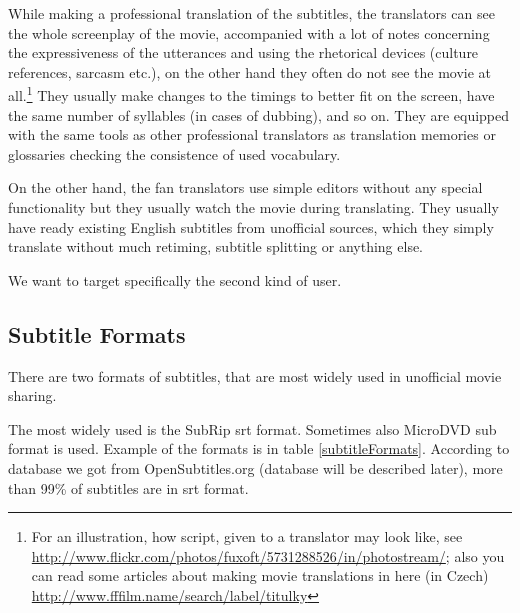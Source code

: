 While making a professional translation of the subtitles, the translators can see the whole screenplay of the movie, accompanied with a lot of notes concerning the expressiveness of the utterances and using the rhetorical devices (culture references, sarcasm etc.), on the other hand they often do not see the movie at all.\footnote{For an illustration, how script, given to a translator may look like, see \url{http://www.flickr.com/photos/fuxoft/5731288526/in/photostream/}; also you can read some articles about making movie translations in here (in Czech) \url{http://www.fffilm.name/search/label/titulky}}
They usually make changes to the timings to better fit on the screen, have the same number of syllables (in cases of dubbing), and so on. They are equipped with the same tools as other professional translators as translation memories or glossaries checking the consistence of used vocabulary. 

On the other hand, the fan translators use simple editors without any special functionality but they usually watch the movie during translating. They usually have ready existing English subtitles from unofficial sources, which they simply translate without much retiming, subtitle splitting or anything else.

We want to target specifically the second kind of user.

\subsection{Subtitle Formats}
\label{subtitle_formats}

There are two formats of subtitles, that are most widely used in unofficial movie sharing.

The most widely used is the SubRip srt format. Sometimes also MicroDVD sub format is used. Example of the formats is in table \ref{subtitleFormats}. According to database we got from OpenSubtitles.org (database will be described later), more than 99\% of subtitles are in srt format.


